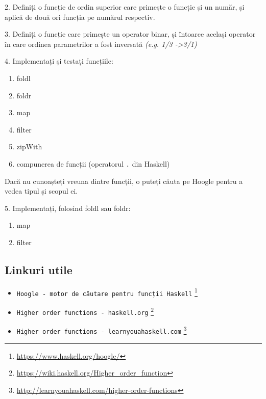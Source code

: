 2. Definiți o funcție de ordin superior care primește o funcție și un număr, și aplică de două ori funcția pe numărul respectiv.

3. Definiți o funcție care primește un operator binar, și întoarce același operator în care ordinea parametrilor a fost inversată \textit{(e.g. 1/3 -\textgreater  3/1)}

4. Implementați și testați funcțiile:
\begin{enumerate}
	\item  foldl
	\item  foldr
	\item  map
	\item  filter
	\item  zipWith
	\item  compunerea de funcții (operatorul \texttt{.} din Haskell)
\end{enumerate}

\begin{tcolorbox}[colback=cyan!5, colframe=cyan!10, breakable]
Dacă nu cunoașteți vreuna dintre funcții, o puteți căuta pe Hoogle pentru a vedea tipul și scopul ei.
\end{tcolorbox}

5. Implementați, folosind foldl sau foldr:
\begin{enumerate}
	\item  map
	\item  filter
\end{enumerate}
\subsection*{ Linkuri utile }
\begin{itemize}
	\item  \texttt{Hoogle - motor de căutare pentru funcții Haskell} \footnote{\url{https://www.haskell.org/hoogle/}}
	\item  \texttt{Higher order functions - haskell.org} \footnote{\url{https://wiki.haskell.org/Higher\_order\_function}}
	\item  \texttt{Higher order functions - learnyouahaskell.com} \footnote{\url{http://learnyouahaskell.com/higher-order-functions}}
\end{itemize}
